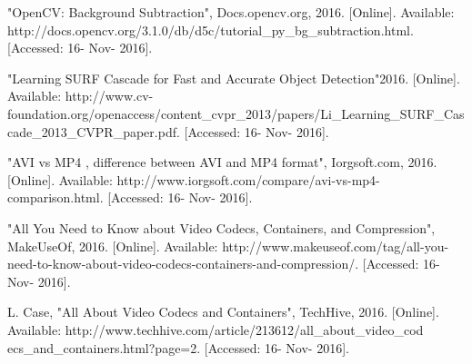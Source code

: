 \documentclass[letterpaper,10pt,onecolumn,draftclsnofoot]{IEEEtran}
\begin{document}
\begin{thebibliography}{99}
"OpenCV: Background Subtraction", Docs.opencv.org, 2016. [Online]. Available: http://docs.opencv.org/3.1.0/db/d5c/tutorial\_py\_bg\_subtraction.html. [Accessed: 16- Nov- 2016].

"Learning SURF Cascade for Fast and Accurate Object Detection"2016. [Online]. Available: http://www.cv-foundation.org/openaccess/content\_cvpr\_2013/papers/Li\_Learning\_SURF\_Cascade\_2013\_CVPR\_paper.pdf. [Accessed: 16- Nov- 2016].

"AVI vs MP4 , difference between AVI and MP4 format", Iorgsoft.com, 2016. [Online]. Available: http://www.iorgsoft.com/compare/avi-vs-mp4-comparison.html. [Accessed: 16- Nov- 2016].

"All You Need to Know about Video Codecs, Containers, and Compression", MakeUseOf, 2016. [Online]. Available: http://www.makeuseof.com/tag/all-you-need-to-know-about-video-codecs-containers-and-compression/. [Accessed: 16- Nov- 2016].

L.  Case, "All About Video Codecs and Containers", TechHive, 2016. [Online]. Available: http://www.techhive.com/article/213612/all\_about\_video\_cod\\ecs\_and\_containers.html?page=2. [Accessed: 16- Nov- 2016].


\end{thebibliography}


%



\end{document}
